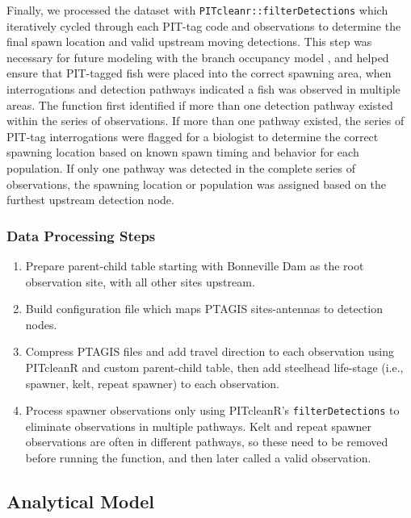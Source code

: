 \documentclass[11pt,a4paper,]{article}
\providecommand{\tightlist}{%
  \setlength{\itemsep}{0pt}\setlength{\parskip}{0pt}}
\begin{document}
Finally, we processed the dataset with \texttt{PITcleanr::filterDetections} which iteratively cycled through each PIT-tag code and observations to determine the final spawn location and valid upstream moving detections. This step was necessary for future modeling with the branch occupancy model \autocite{seePITTagBased2016}, and helped ensure that PIT-tagged fish were placed into the correct spawning area, when interrogations and detection pathways indicated a fish was observed in multiple areas. The function first identified if more than one detection pathway existed within the series of observations. If more than one pathway existed, the series of PIT-tag interrogations were flagged for a biologist to determine the correct spawning location based on known spawn timing and behavior for each population. If only one pathway was detected in the complete series of observations, the spawning location or population was assigned based on the furthest upstream detection node.

\hypertarget{data-processing-steps}{%
\subsubsection{Data Processing Steps}\label{data-processing-steps}}

\begin{enumerate}
\def\labelenumi{\arabic{enumi}.}
\tightlist
\item
  Prepare parent-child table starting with Bonneville Dam as the root observation site, with all other sites upstream.
\item
  Build configuration file which maps PTAGIS sites-antennas to detection nodes.
\item
  Compress PTAGIS files and add travel direction to each observation using PITcleanR and custom parent-child table, then add steelhead life-stage (i.e., spawner, kelt, repeat spawner) to each observation.
\item
  Process spawner observations only using PITcleanR's \texttt{filterDetections} to eliminate observations in multiple pathways. Kelt and repeat spawner observations are often in different pathways, so these need to be removed before running the function, and then later called a valid observation.
\end{enumerate}

\hypertarget{analytical-model}{%
\subsection{Analytical Model}\label{analytical-model}}
\end{document}
